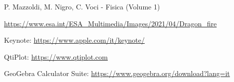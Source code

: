 
P. Mazzoldi, M. Nigro, C. Voci - Fisica (Volume 1)

\href{https://www.esa.int/ESA_Multimedia/Images/2021/04/Dragon_fire}{
    \textcolor[RGB]{\tagcolor}{
        https://www.esa.int/ESA\_Multimedia/Images/2021/04/Dragon\_fire
        }
}

Keynote:
\href{https://www.apple.com/it/keynote/}{
    https://www.apple.com/it/keynote/
}

QtiPlot:
\href{https://www.qtiplot.com}{
    https://www.qtiplot.com
}

GeoGebra Calculator Suite:
\href{https://www.geogebra.org/download?lang=it}{
    https://www.geogebra.org/download?lang=it
    }